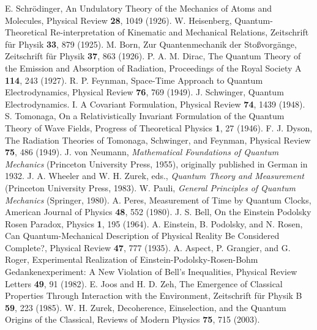 \documentclass[12pt,a4paper]{article}
\begin{document}
	\begin{thebibliography}{99}
		 E. Schrödinger, An Undulatory Theory of the Mechanics of Atoms and Molecules, Physical Review \textbf{28}, 1049 (1926).
		 W. Heisenberg, Quantum-Theoretical Re-interpretation of Kinematic and Mechanical Relations, Zeitschrift für Physik \textbf{33}, 879 (1925).
		 M. Born, Zur Quantenmechanik der Stoßvorgänge, Zeitschrift für Physik \textbf{37}, 863 (1926).
		 P. A. M. Dirac, The Quantum Theory of the Emission and Absorption of Radiation, Proceedings of the Royal Society A \textbf{114}, 243 (1927).
		 R. P. Feynman, Space-Time Approach to Quantum Electrodynamics, Physical Review \textbf{76}, 769 (1949).
		 J. Schwinger, Quantum Electrodynamics. I. A Covariant Formulation, Physical Review \textbf{74}, 1439 (1948).
		 S. Tomonaga, On a Relativistically Invariant Formulation of the Quantum Theory of Wave Fields, Progress of Theoretical Physics \textbf{1}, 27 (1946).
		 F. J. Dyson, The Radiation Theories of Tomonaga, Schwinger, and Feynman, Physical Review \textbf{75}, 486 (1949).
		 J. von Neumann, \textit{Mathematical Foundations of Quantum Mechanics} (Princeton University Press, 1955), originally published in German in 1932.
		 J. A. Wheeler and W. H. Zurek, eds., \textit{Quantum Theory and Measurement} (Princeton University Press, 1983).
		 W. Pauli, \textit{General Principles of Quantum Mechanics} (Springer, 1980).
		 A. Peres, Measurement of Time by Quantum Clocks, American Journal of Physics \textbf{48}, 552 (1980).
		 J. S. Bell, On the Einstein Podolsky Rosen Paradox, Physics \textbf{1}, 195 (1964).
		 A. Einstein, B. Podolsky, and N. Rosen, Can Quantum-Mechanical Description of Physical Reality Be Considered Complete?, Physical Review \textbf{47}, 777 (1935).
		 A. Aspect, P. Grangier, and G. Roger, Experimental Realization of Einstein-Podolsky-Rosen-Bohm Gedankenexperiment: A New Violation of Bell's Inequalities, Physical Review Letters \textbf{49}, 91 (1982).
		 E. Joos and H. D. Zeh, The Emergence of Classical Properties Through Interaction with the Environment, Zeitschrift für Physik B \textbf{59}, 223 (1985).
		 W. H. Zurek, Decoherence, Einselection, and the Quantum Origins of the Classical, Reviews of Modern Physics \textbf{75}, 715 (2003).

\end{thebibliography}
\end{document}

